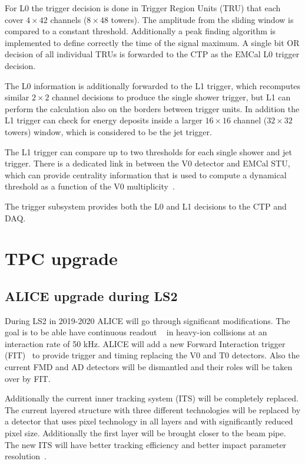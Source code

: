For L0 the trigger decision is done in Trigger Region Units (TRU) that each cover $4\times42$ channels ($8\times48$ towers). The amplitude from the sliding window is compared to a constant threshold. Additionally a peak finding algorithm is implemented to define correctly the time of the signal maximum. A single bit OR decision of all individual TRUs is forwarded to the CTP as the EMCal L0 trigger decision.

The L0 information is additionally forwarded to the L1 trigger, which recomputes similar $2\times2$ channel decisions to produce the single shower trigger, but L1 can perform the calculation also on the borders between trigger units. In addition the L1 trigger can  check for energy deposits inside a larger $16\times16$ channel ($32\times32$ towers) window, which is considered to be the jet trigger.

The L1 trigger can compare up to two thresholds for each single shower and jet trigger. There is a dedicated link in between the V0 detector and EMCal STU, which can provide centrality information that is used to compute a dynamical threshold as a function of the V0 multiplicity~\cite{KRAL2012261}.

The trigger subsystem provides both the L0 and L1 decisions to the CTP and DAQ. 


\section{TPC upgrade}
\label{sec:tpcupgrade}
\subsection{ALICE upgrade during LS2}
During LS2 in 2019-2020 ALICE will go through significant modifications. The goal is to be able have continuous readout ~\cite{aliceupgrade} in heavy-ion collisions at an interaction rate of 50 kHz.  ALICE will add a new Forward Interaction trigger (FIT)~\cite{Maevskaya:2019bba} to provide trigger and timing replacing the V0 and T0 detectors. Also the current FMD and AD detectors will be dismantled and their roles will be taken over by FIT.

Additionally the current inner tracking system (ITS) will be completely replaced. The current layered structure with three different technologies will be replaced by a detector that uses pixel technology in all layers and with significantly reduced pixel size. Additionally the first layer will be brought closer to the beam pipe. The new ITS will have better tracking efficiency and better impact parameter resolution~\cite{ITSupgrade}. 

